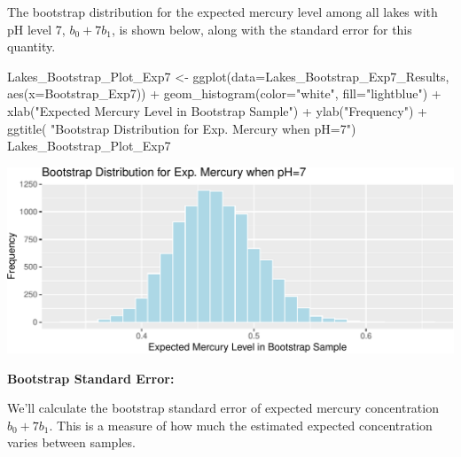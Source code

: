\documentclass[
  letterpaper,
  DIV=11,
  numbers=noendperiod]{scrreprt}
\newenvironment{Shaded}{\begin{snugshade}}{\end{snugshade}}
\newcommand{\AttributeTok}[1]{\textcolor[rgb]{0.40,0.45,0.13}{#1}}
\newcommand{\FunctionTok}[1]{\textcolor[rgb]{0.28,0.35,0.67}{#1}}
\newcommand{\NormalTok}[1]{\textcolor[rgb]{0.00,0.23,0.31}{#1}}
\newcommand{\OtherTok}[1]{\textcolor[rgb]{0.00,0.23,0.31}{#1}}
\newcommand{\SpecialCharTok}[1]{\textcolor[rgb]{0.37,0.37,0.37}{#1}}
\newcommand{\StringTok}[1]{\textcolor[rgb]{0.13,0.47,0.30}{#1}}
\begin{document}
The bootstrap distribution for the expected mercury level among all
lakes with pH level 7, \(b_0+7b_1\), is shown below, along with the
standard error for this quantity.

\begin{Shaded}
\begin{Highlighting}[]
\NormalTok{Lakes\_Bootstrap\_Plot\_Exp7 }\OtherTok{\textless{}{-}} \FunctionTok{ggplot}\NormalTok{(}\AttributeTok{data=}\NormalTok{Lakes\_Bootstrap\_Exp7\_Results, }\FunctionTok{aes}\NormalTok{(}\AttributeTok{x=}\NormalTok{Bootstrap\_Exp7)) }\SpecialCharTok{+}  
  \FunctionTok{geom\_histogram}\NormalTok{(}\AttributeTok{color=}\StringTok{"white"}\NormalTok{, }\AttributeTok{fill=}\StringTok{"lightblue"}\NormalTok{) }\SpecialCharTok{+} 
  \FunctionTok{xlab}\NormalTok{(}\StringTok{"Expected Mercury Level in Bootstrap Sample"}\NormalTok{) }\SpecialCharTok{+} \FunctionTok{ylab}\NormalTok{(}\StringTok{"Frequency"}\NormalTok{) }\SpecialCharTok{+}
  \FunctionTok{ggtitle}\NormalTok{( }\StringTok{"Bootstrap Distribution for Exp. Mercury when pH=7"}\NormalTok{) }
\NormalTok{Lakes\_Bootstrap\_Plot\_Exp7}
\end{Highlighting}
\end{Shaded}

\includegraphics{Ch3_files/figure-pdf/unnamed-chunk-135-1.pdf}

\textbf{Bootstrap Standard Error:}

We'll calculate the bootstrap standard error of expected mercury
concentration \(b_0 + 7b_1\). This is a measure of how much the
estimated expected concentration varies between samples.

\begin{Shaded}
\end{Shaded}
\end{document}
